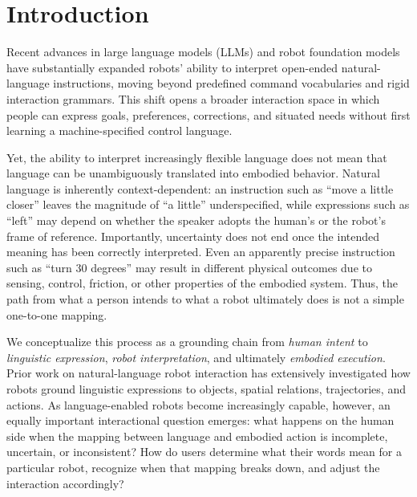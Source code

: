 

\section{Introduction}

Recent advances in large language models (LLMs) and robot foundation models have substantially expanded robots' ability to interpret open-ended natural-language instructions, moving beyond predefined command vocabularies and rigid interaction grammars. \citep{ichter2023saycan, driess2023palme, brohan2023rt2} This shift opens a broader interaction space in which people can express goals, preferences, corrections, and situated needs without first learning a machine-specified control language.

Yet, the ability to interpret increasingly flexible language does not mean that language can be unambiguously translated into embodied behavior. Natural language is inherently context-dependent: an instruction such as ``move a little closer'' leaves the magnitude of ``a little'' underspecified, while expressions such as ``left'' may depend on whether the speaker adopts the human's or the robot's frame of reference. \citep{kocher2020left, li2016spatial} Importantly, uncertainty does not end once the intended meaning has been correctly interpreted. Even an apparently precise instruction such as ``turn 30 degrees'' may result in different physical outcomes due to sensing, control, friction, or other properties of the embodied system. Thus, the path from what a person intends to what a robot ultimately does is not a simple one-to-one mapping.

We conceptualize this process as a grounding chain from \textit{human intent} to \textit{linguistic expression}, \textit{robot interpretation}, and ultimately \textit{embodied execution}. Prior work on natural-language robot interaction has extensively investigated how robots ground linguistic expressions to objects, spatial relations, trajectories, and actions. \citep{tellex2011commands, kollar2010directions, matuszek2013parse} As language-enabled robots become increasingly capable, however, an equally important interactional question emerges: what happens on the human side when the mapping between language and embodied action is incomplete, uncertain, or inconsistent? How do users determine what their words mean for a particular robot, recognize when that mapping breaks down, and adjust the interaction accordingly?


